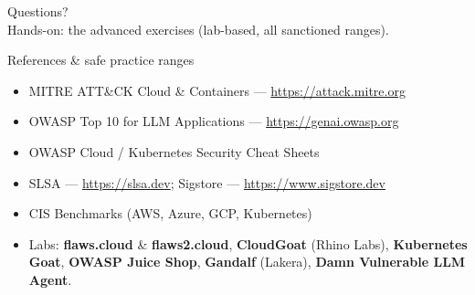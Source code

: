 \documentclass[aspectratio=169,11pt]{beamer}
\begin{document}
\begin{frame}[standout]
  Questions?\\[1em]
  \small Hands-on: the advanced exercises (lab-based, all sanctioned ranges).
\end{frame}

\begin{frame}{References \& safe practice ranges}
  \footnotesize
  \begin{itemize}
    \item MITRE ATT\&CK Cloud \& Containers --- \url{https://attack.mitre.org}
    \item OWASP Top 10 for LLM Applications --- \url{https://genai.owasp.org}
    \item OWASP Cloud / Kubernetes Security Cheat Sheets
    \item SLSA --- \url{https://slsa.dev}; Sigstore --- \url{https://www.sigstore.dev}
    \item CIS Benchmarks (AWS, Azure, GCP, Kubernetes)
    \item Labs: \textbf{flaws.cloud} \& \textbf{flaws2.cloud}, \textbf{CloudGoat}
          (Rhino Labs), \textbf{Kubernetes Goat}, \textbf{OWASP Juice Shop},
          \textbf{Gandalf} (Lakera), \textbf{Damn Vulnerable LLM Agent}.
  \end{itemize}
\end{frame}
\end{document}

